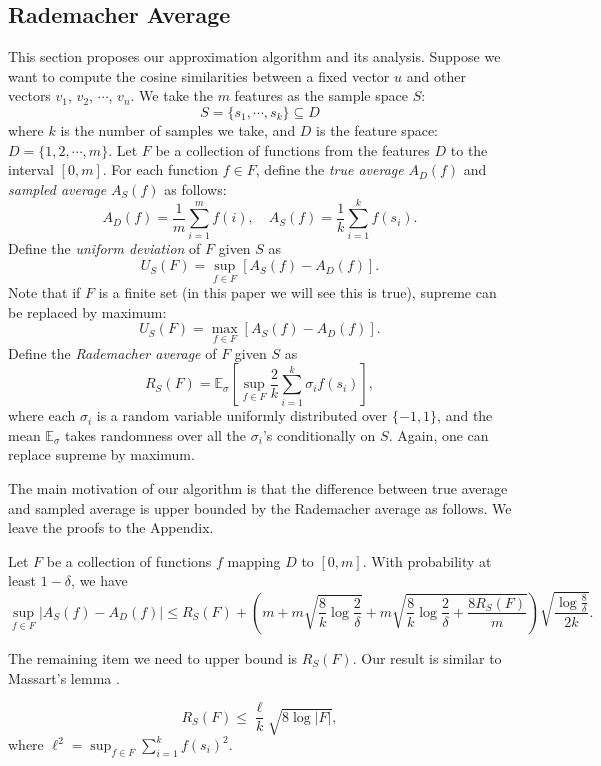 \documentclass{article}
\begin{document}
\subsection{Rademacher Average}
This section proposes our approximation algorithm and its analysis.
Suppose we want to compute the cosine similarities between a fixed vector $u$ and other vectors $v_1$, $v_2$, $\cdots$, $v_n$. We take the $m$ features as the sample space $S$:
$$S = \{s_1, \cdots, s_k\} \subseteq D$$
where $k$ is the number of samples we take, and $D$ is the feature space: $D = \{1,2,\cdots,m\}$.
Let $F$ be a collection of functions from the features $D$ to the interval $[0, m]$.
For each function $f\in F$, define the \emph{true average} $A_D(f)$ and \emph{sampled average} $A_S(f)$ as follows:
$$A_D(f) = \frac{1}{m} \sum_{i=1}^m f(i),\quad A_S(f) = \frac{1}{k} \sum_{i=1}^k f(s_i).$$
Define the \emph{uniform deviation} \cite{Oneto13} of $F$ given $S$ as
$$U_S(F) = \sup_{f\in F} [ A_S(f) - A_D(f) ].$$
Note that if $F$ is a finite set (in this paper we will see this is true), supreme can be replaced by maximum:
$$U_S(F) = \max_{f\in F} [ A_S(f) - A_D(f) ].$$
Define the \emph{Rademacher average} \cite{Mohri09,BM02,Oneto13} of $F$ given $S$ as
\newcommand{\E}{\mathbb{E}}
$$R_S(F) = \E_\sigma \left[\sup_{f\in F} \frac{2}{k}\sum_{i=1}^k \sigma_i f(s_i) \right],$$
where each $\sigma_i$ is a random variable uniformly distributed over $\{-1, 1\}$, and the mean $\E_\sigma$ takes randomness over all the $\sigma_i$'s conditionally on $S$. Again, one can replace supreme by maximum.

The main motivation of our algorithm is that the difference between true average and sampled average is upper bounded by the Rademacher average as follows.
We leave the proofs to the Appendix.

\begin{theorem}
\label{thm:main}
Let $F$ be a collection of functions $f$ mapping $D$ to $[0,m]$. 
With probability at least $1-\delta$, we have
$$\sup_{f\in F}|A_S(f) - A_D(f)| \leq R_S(F) + \left(m+m\sqrt{\frac{8}{k}\log \frac{2}{\delta}} + m\sqrt{\frac{8}{k}\log \frac{2}{\delta} + \frac{8R_S(F)}{m}}\right)\sqrt{\frac{\log \frac{8}{\delta}}{2k}}.$$
\end{theorem}

The remaining item we need to upper bound is $R_S(F)$. Our result is similar to Massart's lemma \cite{AGO14}.

\begin{theorem}
\label{thm2}
$$R_S(F) \leq \frac{\ell}{k}\sqrt{8\log |F|},$$
where $\ell^2 = \sup_{f\in F}\sum_{i=1}^k f(s_i)^2$.
\end{theorem}
\end{document}
